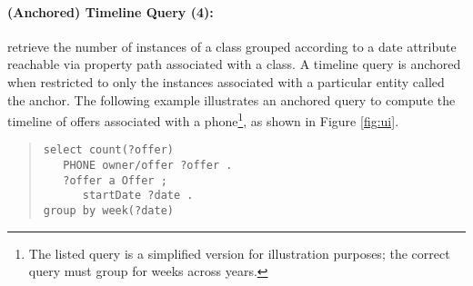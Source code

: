 \paragraph{(Anchored) Timeline Query (4):} retrieve the number of instances of a class grouped according to a date attribute reachable via property path associated with a class.
A timeline query is anchored when restricted to only the instances associated with a particular entity called the anchor.
The following example illustrates an anchored query to compute the timeline of offers associated with a phone\footnote{The listed query is a simplified version for illustration purposes; the correct query must group for weeks across years.}, as shown in Figure \ref{fig:ui}.
\begin{quote}
{\footnotesize
\begin{verbatim}
select count(?offer)
   PHONE owner/offer ?offer .
   ?offer a Offer ;
      startDate ?date .
group by week(?date)
\end{verbatim}}
\end{quote}
